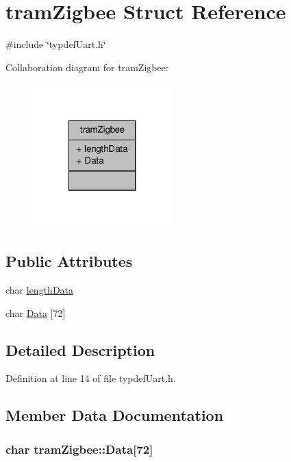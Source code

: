\hypertarget{structtramZigbee}{\section{tram\-Zigbee Struct Reference}
\label{structtramZigbee}
}


{\ttfamily \#include \char`\"{}typdef\-Uart.\-h\char`\"{}}



Collaboration diagram for tram\-Zigbee\-:\nopagebreak
\begin{figure}[H]
\begin{center}
\leavevmode
\includegraphics[width=152pt]{structtramZigbee__coll__graph}
\end{center}
\end{figure}
\subsection*{Public Attributes}
\begin{DoxyCompactItemize}
\item 
char \hyperlink{structtramZigbee_a688bc48e9e6da34837d4636d5e60b849}{length\-Data}
\item 
char \hyperlink{structtramZigbee_a3871224e0e052d996b31a4f1d4df51f2}{Data} \mbox{[}72\mbox{]}
\end{DoxyCompactItemize}


\subsection{Detailed Description}


Definition at line 14 of file typdef\-Uart.\-h.



\subsection{Member Data Documentation}
\hypertarget{structtramZigbee_a3871224e0e052d996b31a4f1d4df51f2}{
\subsubsection[{Data}]{\setlength{\rightskip}{0pt plus 5cm}char tram\-Zigbee\-::\-Data\mbox{[}72\mbox{]}}}\label{structtramZigbee_a3871224e0e052d996b31a4f1d4df51f2}



